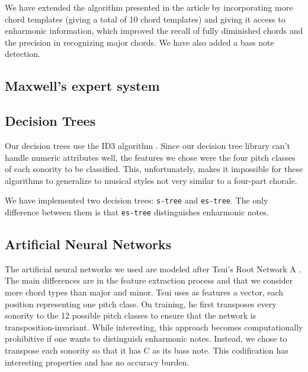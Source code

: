\documentclass{article}
\newcommand{\comment}[1]{}
\begin{document}
We have extended the algorithm presented in the article by
incorporating more chord templates (giving a total of 10 chord
templates) and giving it access to enharmonic information, which
improved the recall of fully diminished chords and the precision in
recognizing major chords. We have also added a bass note detection.

\subsection{Maxwell's expert system}
\label{sec:maxwell}


\subsection{Decision Trees}
\label{sec:tree}

\comment{
  ==> ID3 algorithm
  ==> features: sequência de pitches
  ==> dependência em quatro vozes 
}

Our decision trees use the ID3 algorithm
\cite{mitchell:machine}. Since our decision tree library can't handle
numeric attributes well, the features we chose were the four pitch
classes of each sonority to be classified. This, unfortunately,
makes it impossible for these algorithms to generalize to musical
styles not very similar to a four-part chorale.

We have implemented two decision trees: \texttt{s-tree} and
\texttt{es-tree}. The only difference between them is that
\texttt{es-tree} distinguishes enharmonic notes.

\subsection{Artificial Neural Networks}
\label{sec:neural-net}

\comment{
  ==> features são weighted pitch counts
  ==> simple/enharmonic-simple/context
}

The artificial neural networks we used are modeled after Tsui's Root
Network A \cite{tsui:harmonic}. The main differences are in the
feature extraction process and that we consider more chord types than
major and minor. Tsui \cite{tsui:harmonic} uses as features a vector,
each position representing one pitch class. On training, he first
transposes every sonority to the 12 possible pitch classes to ensure
that the network is transposition-invariant. While interesting, this
approach becomes computationally prohibitive if one wants to
distinguish enharmonic notes. Instead, we chose to transpose each
sonority so that it has C as its bass note. This codification has
interesting properties and has no accuracy burden.
\end{document}
